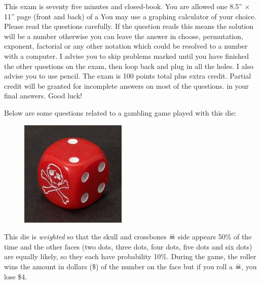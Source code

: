 \documentclass[12pt]{article}
\begin{document}
This exam is seventy five minutes and closed-book. You are allowed one 8.5'' $\times$ 11'' page (front and back) of a  You may use a graphing calculator of your choice. Please read the questions carefully. If the question reads  this means the solution will be a number otherwise you can leave the answer in choose, permutation, exponent, factorial or any other notation which could be resolved to a number with a computer. I advise you to skip problems marked  until you have finished the other questions on the exam, then loop back and plug in all the holes. I also advise you to use pencil. The exam is 100 points total plus extra credit. Partial credit will be granted for incomplete answers on most of the questions.  in your final answers. Good luck!

\pagebreak

%
%


\problem Below are some questions related to a gambling game played with this die:

\begin{figure}[htp]
\centering
\includegraphics[width=2in]{skull_dice.jpg}
\end{figure}

\noindent This die is \emph{weighted} so that the skull and crossbones $\skull$ side appears 50\% of the time and the other faces (two dots, three dots, four dots, five dots and six dots) are equally likely, so they each have probability 10\%. During the game, the roller wins the amount in dollars (\$) of the number on the face but if you roll a $\skull$, you lose \$4. 
\end{document}
